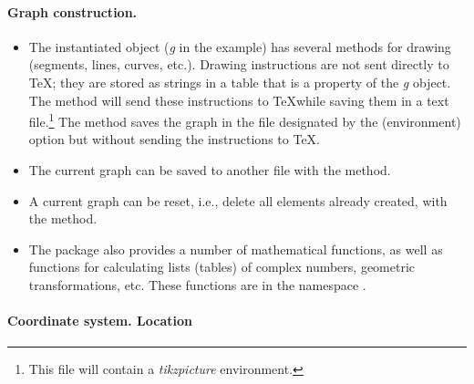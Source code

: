 \paragraph{Graph construction.}

\begin{itemize}
    \item The instantiated object (\emph{g} in the example) has several methods for drawing (segments, lines, curves, etc.). Drawing instructions are not sent directly to \TeX; they are stored as strings in a table that is a property of the \emph{g} object. The  method will send these instructions to \TeX while saving them in a text file.\footnote{This file will contain a \emph{tikzpicture} environment.} The  method saves the graph in the file designated by the (environment) option  but without sending the instructions to \TeX.

    \item The current graph can be saved to another file with the  method.

    \item A current graph can be reset, i.e., delete all elements already created, with the  method.

    \item The \luadrawenv package also provides a number of mathematical functions, as well as functions for calculating lists (tables) of complex numbers, geometric transformations, etc. These functions are in the namespace \luadrawenv.
\end{itemize}

\paragraph{Coordinate system. Location}

